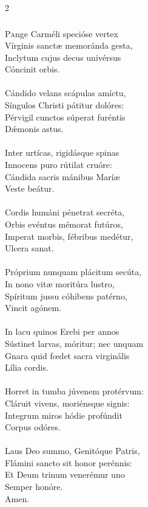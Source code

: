 \documentclass[9pt,twoside]{extarticle}
\begin{document}
\begin{multicols}{2}
\subsubsection*{\center {}}
\lettrine{P}ange Carméli specióse vertex\\
Vírginis sanctæ memoránda gesta,\\
Inclytum cujus decus univérsus\\
Cóncinit orbis.\\
\\
Cándido velans scápulas amíctu,\\
Síngulos Christi pátitur dolóres:\\
Pérvigil cunctos súperat furéntis\\
Dǽmonis astus.\\
\\
Inter urtícas, rigidásque spinas\\
Innocens puro rútilat cruóre:\\
Cándida sacris mánibus Maríæ\\
Veste beátur.\\
\\
Cordis humáni pénetrat secréta,\\
Orbis evéntus mémorat futúros,\\
Imperat morbis, fébribus medétur,\\
Ulcera sanat.\\
\\
Próprium nunquam plácitum secúta,\\
In nono vitæ moritúra lustro,\\
Spíritum jussu cóhibens patérno,\\
Vincit agónem.\\
\\
In lacu quinos Erebi per annos\\
Sústinet larvas, móritur; nec unquam\\
Gnara quid fœdet sacra virginális\\
Lília cordis.\\
\\
Horret in tumba júvenem protérvum:\\
Cláruit vivens, moriénsque signis:\\
Integrum miros hódie profúndit\\
Corpus odóres.\\
\\
Laus Deo summo, Genitóque Patris,\\
Flámini sancto sit honor perénnis:\\
Et Deum trinum venerémur uno\\
Semper honóre.\\
Amen.


\end{multicols}
\end{document}
